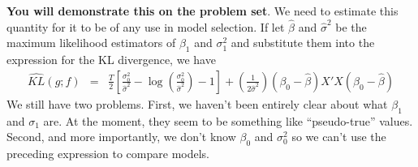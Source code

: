 \documentclass[12pt]{article}
\theoremstyle{definition}
\begin{document}
\textbf{You will demonstrate this on the problem set}. We need to estimate this quantity for it to be of any use in model selection. If let $\widehat{\beta}$ and $\widehat{\sigma}^2$ be the maximum likelihood estimators of $\beta_1$ and $\sigma_1^2$ and substitute them into the expression for the KL divergence, we have
\begin{eqnarray*}
\widehat{KL}(g;f) &=& \frac{T}{2}\left[\frac{\sigma_0^2}{\widehat{\sigma}^2} - \log\left(\frac{\sigma_0^2}{\widehat{\sigma}^2} \right) - 1\right] + \left(\frac{1}{2\widehat{\sigma}^2} \right)\left(\beta_0 - \widehat{\beta}\right)X'X\left(\beta_0 - \widehat{\beta}\right)
\end{eqnarray*}
We still have two problems. First, we haven't been entirely clear about what $\beta_1$ and $\sigma_1$ are. At the moment, they seem to be something like ``pseudo-true'' values. Second, and more importantly, we don't know $\beta_0$ and $\sigma_0^2$ so we can't use the preceding expression to compare models.
\end{document}
